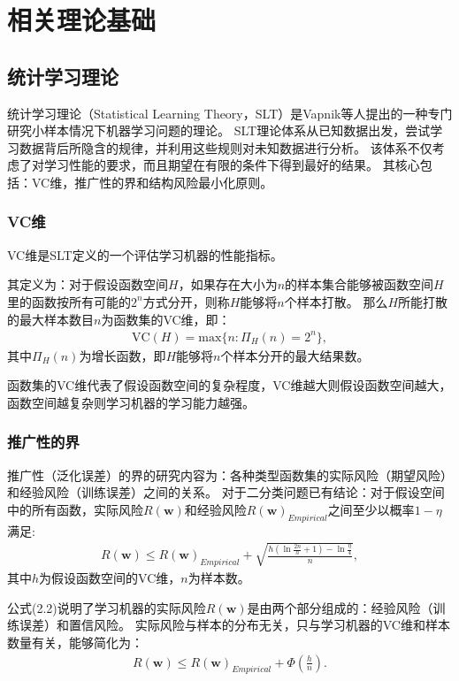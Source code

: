 \chapter{相关理论基础}

\section{统计学习理论}

统计学习理论（Statistical Learning Theory，SLT）是Vapnik等人提出的一种专门研究小样本情况下机器学习问题的理论\cite{vapnik2013nature}。
SLT理论体系从已知数据出发，尝试学习数据背后所隐含的规律，并利用这些规则对未知数据进行分析。
该体系不仅考虑了对学习性能的要求，而且期望在有限的条件下得到最好的结果。
其核心包括：VC维，推广性的界和结构风险最小化原则。

\subsection{VC维}

VC维是SLT定义的一个评估学习机器的性能指标。

其定义为：对于假设函数空间$H$，如果存在大小为$n$的样本集合能够被函数空间$H$里的函数按所有可能的$2^n$方式分开，则称$H$能够将$n$个样本打散。
那么$H$所能打散的最大样本数目$n$为函数集的VC维，即：
\begin{align}
    \mathrm{VC}(H)=\mathrm{max}\{n:\Pi_H(n)=2^n\},
\end{align}
其中$\Pi_H(n)$为增长函数，即$H$能够将$n$个样本分开的最大结果数。

函数集的VC维代表了假设函数空间的复杂程度，VC维越大则假设函数空间越大，函数空间越复杂则学习机器的学习能力越强。

\subsection{推广性的界}

推广性（泛化误差）的界的研究内容为：各种类型函数集的实际风险（期望风险）和经验风险（训练误差）之间的关系。
对于二分类问题已有结论：对于假设空间中的所有函数，实际风险$R(\mathbf{w})$和经验风险$R(\mathbf{w})_{Empirical}$之间至少以概率$1-\eta$满足:
\begin{align}
    R(\mathbf{w})\leq R(\mathbf{w})_{Empirical} + \sqrt{\frac{h(\ln{\frac{2n}{h}+1}) - \ln{\frac{\eta}{4}}}{n}},
\end{align}
其中$h$为假设函数空间的VC维，$n$为样本数。

公式(2.2)说明了学习机器的实际风险$R(\mathbf{w})$是由两个部分组成的：经验风险（训练误差）和置信风险。
实际风险与样本的分布无关，只与学习机器的VC维和样本数量有关，能够简化为：
\begin{align}
    R(\mathbf{w})\leq R(\mathbf{w})_{Empirical} + \Phi(\frac{h}{n}).
\end{align}

